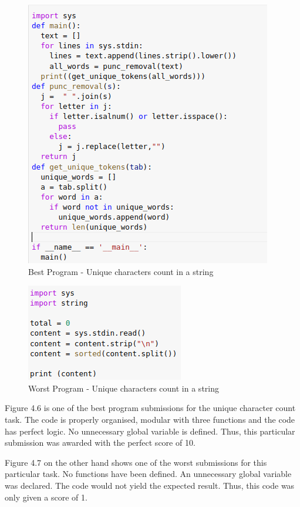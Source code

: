 \begin{figure}[h]
\centering
\includegraphics{./figures/best_uc.png}
\caption{Best Program - Unique characters count in a string}
\label{fig1}
\end{figure}

\newpage

\begin{figure}[H]
\centering
\includegraphics{./figures/worst_uc.png}
\caption{Worst Program - Unique characters count in a string}
\label{fig1}
\end{figure}

Figure 4.6 is one of the best program submissions for the
unique character count task. The code is properly organised,
modular with three functions and the code has perfect
logic. No unnecessary global variable is defined. Thus, this
particular submission was awarded with the perfect score of
10.

Figure 4.7 on the other hand shows one of the worst
submissions for this particular task. No functions have been
defined. An unnecessary global variable was declared. The
code would not yield the expected result. Thus, this code was
only given a score of 1.

